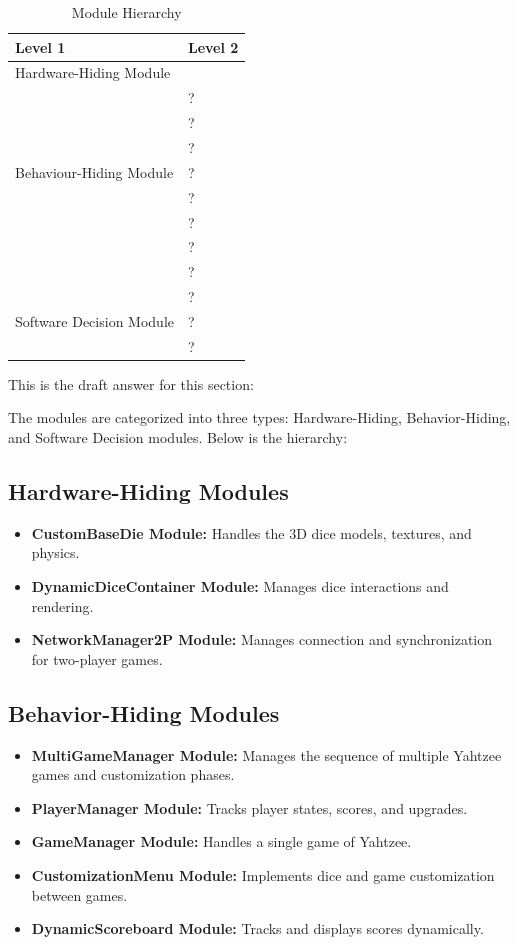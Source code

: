 \documentclass[12pt, titlepage]{article}
\begin{document}
\begin{table}[h!]
\centering
\begin{tabular}{p{} p{}}
\toprule
\textbf{Level 1} & \textbf{Level 2}\\
\midrule

{Hardware-Hiding Module} & ~ \\
\midrule

\multirow{7}{0.3\textwidth}{Behaviour-Hiding Module} & ?\\
& ?\\
& ?\\
& ?\\
& ?\\
& ?\\
& ?\\ 
& ?\\
\midrule

\multirow{3}{0.3\textwidth}{Software Decision Module} & {?}\\
& ?\\
& ?\\
\bottomrule

\end{tabular}
\caption{Module Hierarchy}
\label{TblMH}
\end{table}

This is the draft answer for this section:

The modules are categorized into three types: Hardware-Hiding, Behavior-Hiding, and Software Decision modules. Below is the hierarchy:

\subsection{Hardware-Hiding Modules}
\begin{itemize}
    \item \textbf{CustomBaseDie Module:} Handles the 3D dice models, textures, and physics.
    \item \textbf{DynamicDiceContainer Module:} Manages dice interactions and rendering.
    \item \textbf{NetworkManager2P Module:} Manages connection and synchronization for two-player games.
\end{itemize}

\subsection{Behavior-Hiding Modules}
\begin{itemize}
    \item \textbf{MultiGameManager Module:} Manages the sequence of multiple Yahtzee games and customization phases.
    \item \textbf{PlayerManager Module:} Tracks player states, scores, and upgrades.
    \item \textbf{GameManager Module:} Handles a single game of Yahtzee.
    \item \textbf{CustomizationMenu Module:} Implements dice and game customization between games.
    \item \textbf{DynamicScoreboard Module:} Tracks and displays scores dynamically.
\end{itemize}
\end{document}
